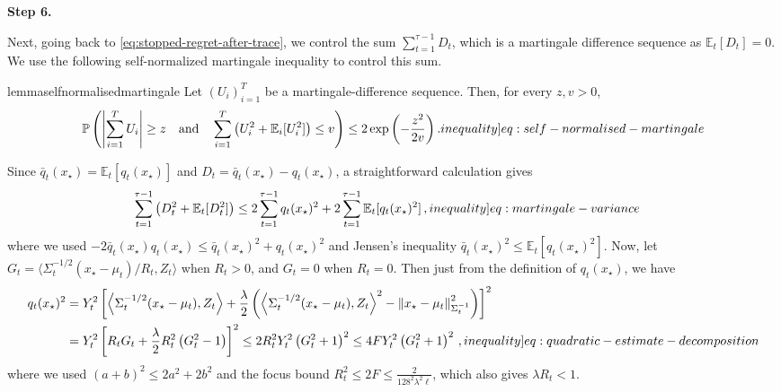 \documentclass[12pt,cleveref]{jmlr}
\newcommand{\ineqlabel}[1]{\label[inequality]{#1}}
\newcommand{\proofstepinline}[1]{%
    \par\addvspace{0.6\baselineskip}
    \noindent
    {\normalfont\normalsize\bfseries\color{blue!55!black}Step #1.}\enspace\ignorespaces
}
\newcommand{\E}{\mathbb E}
\newcommand{\Pp}{\mathbb P}
\newcommand{\1}{\mathbf 1}
\newcommand{\normm}[2]{\left\lVert #1\right\rVert_{#2}}
\begin{document}
\proofstepinline{6}
Next, going back to \cref{eq:stopped-regret-after-trace},
we control the sum $\sum_{t=1}^{\tau-1}D_t$, which is a martingale difference sequence as $\E_t[D_t]=0$.
We use the following self-normalized martingale inequality \citet[Theorem~3.26]{bercu2015concentration} to control this sum.
\begin{restatable}{lemma}{selfnormalisedmartingale}
    \label{lem:self-normalised-martingale}
    Let $(U_i)_{i=1}^T$ be a martingale-difference sequence. Then, for every $z,v>0$,
    \begin{align}
        \Pp\left(
            \left|\sum_{i=1}^T U_i\right|\geq z\quad\text{and}\quad
            \sum_{i=1}^T \left(U_i^2+\E_i[U_i^2]\right)\leq v
        \right)
        \leq
        2\exp\left(-\frac{z^2}{2v}\right).
        \ineqlabel{eq:self-normalised-martingale}
    \end{align}
\end{restatable}
Since $\bar{q}_t(x_{\star})=\E_t[q_t(x_\star)]$ and $D_t = \bar{q}_t(x_{\star}) - q_t(x_{\star})$,
a straightforward calculation gives
\begin{align}
    \sum_{t=1}^{\tau-1}\left(D_t^2+\E_t[D_t^2]\right)
    & \leq
    2\sum_{t=1}^{\tau-1}
    q_t(x_{\star})^2
    +
    2\sum_{t=1}^{\tau-1}
    \E_t[q_t(x_{\star})^2]\,,
    \ineqlabel{eq:martingale-variance}
\end{align}
where we used $-2\bar{q}_t(x_{\star})q_t(x_{\star}) \leq \bar{q}_t(x_{\star})^2+q_t(x_{\star})^2$ and Jensen's inequality
$\bar{q}_t(x_{\star})^2\leq\E_t[q_t(x_{\star})^2]$.
Now, let $G_t = \langle \Sigma_t^{-1/2}(x_\star-\mu_t)/R_t, Z_t\rangle$
when $R_t>0$, and $G_t = 0$ when $R_t=0$.
Then just from the definition of $q_t(x_\star)$, we have
\begin{align}
    q_t(x_{\star})^2
    & =
    Y_t^2\left[
        \left\langle \Sigma_t^{-1/2}(x_\star - \mu_t), Z_t \right\rangle
        + \frac{\lambda}{2}\left(
            \left\langle \Sigma_t^{-1/2}(x_\star - \mu_t), Z_t \right\rangle^2
            - \normm{x_\star - \mu_t}{\Sigma_t^{-1}}^2
        \right)
    \right]^2 \\
    & =
    Y_t^2\left[
        R_t G_t
        + \frac{\lambda}{2} R_t^2 \left(G_t^2 - 1\right)
    \right]^2
    \leq
    2R_t^2Y_t^2\left(G_t^2+1\right)^2
    \leq
    4F Y_t^2\left(G_t^2+1\right)^2
    \,,
    \ineqlabel{eq:quadratic-estimate-decomposition}
\end{align}
where we used $(a+b)^2\leq2a^2+2b^2$ and the focus bound $R_t^2\leq 2F \leq \frac{2}{128^2\lambda^2 \ell}$, which also gives $\lambda R_t<1$.
\end{document}
